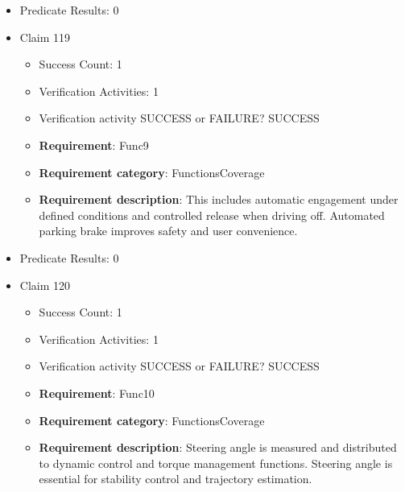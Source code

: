 \documentclass{article}
\begin{document}
\begin{itemize}
\begin{itemize}
						\item \textbf{Requirement}: Func8 
						\item \textbf{Requirement category}: FunctionsCoverage 
						\item \textbf{Requirement description}: Mileage is accumulated from validated speed and distance measurements. Odometer information is required for maintenance, diagnostics, and regulatory compliance.
					
				\end{itemize}
				
									    
				\item Predicate Results: 0

  				  \item Claim 119
				\begin{itemize}
			    	\item Success Count: 1 
			    	\item Verification Activities: 1
					\item Verification activity SUCCESS or FAILURE? SUCCESS
		
						\item \textbf{Requirement}: Func9 
						\item \textbf{Requirement category}: FunctionsCoverage 
						\item \textbf{Requirement description}: This includes automatic engagement under defined conditions and controlled release when driving off. Automated parking brake improves safety and user convenience.
					
				\end{itemize}
				
									    
				\item Predicate Results: 0

  				  \item Claim 120
				\begin{itemize}
			    	\item Success Count: 1 
			    	\item Verification Activities: 1
					\item Verification activity SUCCESS or FAILURE? SUCCESS
		
						\item \textbf{Requirement}: Func10 
						\item \textbf{Requirement category}: FunctionsCoverage 
						\item \textbf{Requirement description}: Steering angle is measured and distributed to dynamic control and torque management functions. Steering angle is essential for stability control and trajectory estimation.
					

\end{itemize}
\end{itemize}
\end{document}
